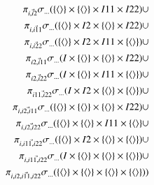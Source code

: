 \begin{eqnarray*}
&& \pi_{\vec{i, i2}}\sigma_{ \dots}( \{{\langle\rangle} \} \times  \{{\langle\rangle} \} \times I11 \times I22) \cup \\
&& \pi_{\vec{i, i11}}\sigma_{ \dots}( \{{\langle\rangle} \} \times I2 \times \{{\langle\rangle} \} \times I22) \cup \\
&& \pi_{\vec{i, i22}}\sigma_{ \dots}(\{{\langle\rangle} \} \times I2 \times I11 \times \{{\langle\rangle} \}) \cup \\
&& \pi_{\vec{i2, i11}}\sigma_{ \dots}(I \times  \{{\langle\rangle} \} \times  \{{\langle\rangle} \} \times I22) \cup \\
&& \pi_{\vec{i2, i22}}\sigma_{ \dots}(I \times \{{\langle\rangle} \}  \times I11 \times \{{\langle\rangle} \}) \cup \\
&& \pi_{\vec{i11, i22}}\sigma_{ \dots}(I \times I2 \times \{{\langle\rangle} \} \times  \{{\langle\rangle} \}) \cup \\
&& \pi_{\vec{i, i2, i11}}\sigma_{ \dots}( \{{\langle\rangle} \} \times \{{\langle\rangle} \}\times  \{{\langle\rangle} \} \times I22) \cup \\
&& \pi_{\vec{i, i2, i22}}\sigma_{ \dots}(\{{\langle\rangle} \} \times \{{\langle\rangle} \} \times I11 \times \{{\langle\rangle}\} \cup \\
&& \pi_{\vec{i, i11, i22}}\sigma_{ \dots}( \{{\langle\rangle} \} \times I2 \times \{{\langle\rangle} \} \times \{{\langle\rangle} \} ) \cup \\
&& \pi_{\vec{i, i11, i22}}\sigma_{ \dots}(I \times \{{\langle\rangle} \} \times \{{\langle\rangle} \} \times  \{{\langle\rangle} \}) \cup \\
&& \pi_{\vec{i, i2, i11, i22}}\sigma_{ \dots}( \{{\langle\rangle} \} \times \{{\langle\rangle} \} \times \{{\langle\rangle} \} \times \{{\langle\rangle} \} )) \\
\end{eqnarray*}

